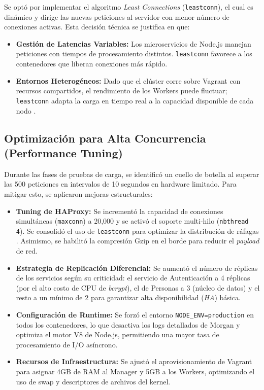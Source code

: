 \documentclass[conference]{IEEEtran}
\begin{document}
Se optó por implementar el algoritmo \textit{Least Connections} (\texttt{leastconn}), el cual es dinámico y dirige las nuevas peticiones al servidor con menor número de conexiones activas. Esta decisión técnica se justifica en que:
\begin{itemize}
    \item \textbf{Gestión de Latencias Variables:} Los microservicios de Node.js manejan peticiones con tiempos de procesamiento distintos. \texttt{leastconn} favorece a los contenedores que liberan conexiones más rápido.
    \item \textbf{Entornos Heterogéneos:} Dado que el clúster corre sobre Vagrant con recursos compartidos, el rendimiento de los Workers puede fluctuar; \texttt{leastconn} adapta la carga en tiempo real a la capacidad disponible de cada nodo \cite{b7}.
\end{itemize}

\subsection{Optimización para Alta Concurrencia (Performance Tuning)}
Durante las fases de pruebas de carga, se identificó un cuello de botella al superar las 500 peticiones en intervalos de 10 segundos en hardware limitado. Para mitigar esto, se aplicaron mejoras estructurales:
\begin{itemize}
    \item \textbf{Tuning de HAProxy:} Se incrementó la capacidad de conexiones simultáneas (\texttt{maxconn}) a 20,000 y se activó el soporte multi-hilo (\texttt{nbthread 4}). Se consolidó el uso de \texttt{leastconn} para optimizar la distribución de ráfagas \cite{b4}. Asimismo, se habilitó la compresión Gzip en el borde para reducir el \textit{payload} de red.
    \item \textbf{Estrategia de Replicación Diferencial:} Se aumentó el número de réplicas de los servicios según su criticidad: el servicio de Autenticación a 4 réplicas (por el alto costo de CPU de \textit{bcrypt}), el de Personas a 3 (núcleo de datos) y el resto a un mínimo de 2 para garantizar alta disponibilidad (\textit{HA}) básica.
    \item \textbf{Configuración de Runtime:} Se forzó el entorno \texttt{NODE\_ENV=production} en todos los contenedores, lo que desactiva los logs detallados de Morgan y optimiza el motor V8 de Node.js, permitiendo una mayor tasa de procesamiento de I/O asíncrono.
    \item \textbf{Recursos de Infraestructura:} Se ajustó el aprovisionamiento de Vagrant para asignar 4GB de RAM al Manager y 5GB a los Workers, optimizando el uso de swap y descriptores de archivos del kernel.
\end{itemize}
\end{document}
